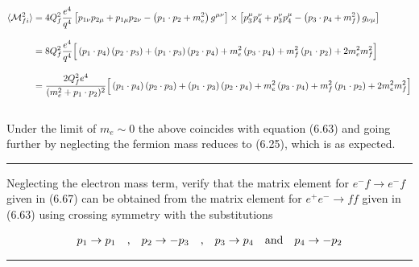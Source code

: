 \begin{solution}
\begin{align*}
    \langle \mathcal{M}_{fi}^2 \rangle  &= 4Q_f^2  \frac{  e^4}{q^4}  \left[ p_{1\nu}p_{2\mu} + p_{1\mu}p_{2\nu} -\left( p_1\cdot p_2 + m_e^2 \right) g^{\mu\nu}\right] \times \left[ p_3^\mu p_4^\nu + p_3^\nu p_4^\mu -\left( p_3\cdot p_4 + m_f^2 \right) g_{\nu\mu}\right] \\[0.12in]
    &= 8Q_f^2  \frac{e^4}{q^4} \Big[  \left(p_1\cdot p_4\right)\left(p_2\cdot p_3\right) + \left(p_1\cdot p_3\right)\left(p_2\cdot p_4\right) + m_e^2 \left( p_3\cdot p_4 \right)  + m_f^2 \left( p_1\cdot p_2 \right) + 2 m_e^2  m_f^2   \Big] \\[0.12in]
    &=  \frac{ 2Q_f^2 e^4}{(m_e^2 + p_1 \cdot p_2)^2} \Big[  \left(p_1\cdot p_4\right)\left(p_2\cdot p_3\right) + \left(p_1\cdot p_3\right)\left(p_2\cdot p_4\right) + m_e^2 \left( p_3\cdot p_4 \right)  + m_f^2 \left( p_1\cdot p_2 \right) + 2 m_e^2  m_f^2   \Big] 
\end{align*}\\
Under the limit of $m_e \sim 0 $ the above coincides with equation (6.63) and going further by neglecting the fermion mass reduces to (6.25), which is as expected.
\end{solution}

\noindent\rule{7in}{1.5pt}


\begin{problem}{6.11}
Neglecting the electron mass term, verify that the matrix element for $e^- f \to e^- f$ given in (6.67) can be obtained from the matrix element for $e^+e^-\to ff$ given in (6.63) using crossing symmetry with the substitutions

\begin{align*}
    p_1 \to p_1 \quad \text{,} \quad p_2 \to -p_3 \quad \text{,} \quad p_3 \to p_4 \quad \text{and} \quad p_4 \to -p_2 \\
\end{align*}

\end{problem}
\begin{solution}

\end{solution}

\noindent\rule{7in}{1.5pt}


